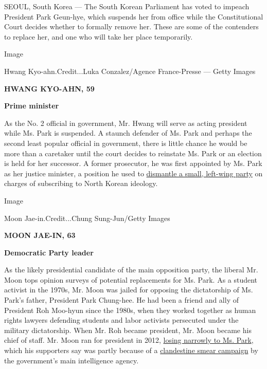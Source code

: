 SEOUL, South Korea --- The South Korean Parliament has voted to impeach
President Park Geun-hye, which suspends her from office while the
Constitutional Court decides whether to formally remove her. These are
some of the contenders to replace her, and one who will take her place
temporarily.

Image

Hwang Kyo-ahn.Credit...Luka Conzalez/Agence France-Presse --- Getty
Images

\textbf{HWANG KYO-AHN, 59}

\textbf{Prime minister}

As the No. 2 official in government, Mr. Hwang will serve as acting
president while Ms. Park is suspended. A staunch defender of Ms. Park
and perhaps the second least popular official in government, there is
little chance he would be more than a caretaker until the court decides
to reinstate Ms. Park or an election is held for her successor. A former
prosecutor, he was first appointed by Ms. Park as her justice minister,
a position he used to
\href{https://www.nytimes3xbfgragh.onion/2014/12/20/world/asia/south-korea-disbands-united-progressive-party-sympathetic-to-north-korea.html}{dismantle
a small, left-wing party} on charges of subscribing to North Korean
ideology.

Image

Moon Jae-in.Credit...Chung Sung-Jun/Getty Images

\textbf{MOON JAE-IN, 63}

\textbf{Democratic Party leader}

As the likely presidential candidate of the main opposition party, the
liberal Mr. Moon tops opinion surveys of potential replacements for Ms.
Park. As a student activist in the 1970s, Mr. Moon was jailed for
opposing the dictatorship of Ms. Park's father, President Park
Chung-hee. He had been a friend and ally of President Roh Moo-hyun since
the 1980s, when they worked together as human rights lawyers defending
students and labor activists persecuted under the military dictatorship.
When Mr. Roh became president, Mr. Moon became his chief of staff. Mr.
Moon ran for president in 2012,
\href{http://www.nytimes3xbfgragh.onion/2012/12/20/world/asia/south-koreans-vote-in-closely-fought-presidential-race.html}{losing
narrowly to Ms. Park}, which his supporters say was partly because of a
\href{http://www.nytimes3xbfgragh.onion/2015/02/10/world/asia/former-spy-chief-in-south-korea-sentenced-in-election-case.html}{clandestine
smear campaign} by the government's main intelligence agency.

